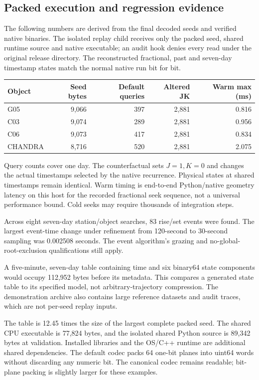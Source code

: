 \subsection{Packed execution and regression evidence}
The following numbers are derived from the final decoded seeds and verified
native binaries. The isolated replay child receives only the packed seed, shared
runtime source and native executable; an audit hook denies every read under the
original release directory. The reconstructed fractional, past and seven-day
timestamp states match the normal native run bit for bit.

\begin{center}\begin{tabular}{@{}lrrrr@{}}\toprule
Object & Seed bytes & Default queries & Altered JK & Warm max (ms)\\\midrule
G05 & 9,066 & 397 & 2,881 & 0.816\\
C03 & 9,074 & 289 & 2,881 & 0.956\\
C06 & 9,073 & 417 & 2,881 & 0.834\\
CHANDRA & 8,716 & 520 & 2,881 & 2.075\\
\bottomrule\end{tabular}\end{center}
Query counts cover one day. The counterfactual sets $J=1,K=0$ and changes the
actual timestamps selected by the native recurrence. Physical states at shared
timestamps remain identical. Warm timing is end-to-end Python/native geometry
latency on this host for the recorded fractional seek sequence, not a universal
performance bound. Cold seeks may require thousands of integration steps.

Across eight seven-day station/object searches, 83 rise/set events were found. The largest event-time change under refinement from 120-second to 30-second sampling was 0.002508 seconds. The event algorithm's grazing and no-global-root-exclusion qualifications still apply.


A five-minute, seven-day table containing time and six binary64 state components
would occupy 112,952 bytes before its metadata. This compares a generated state
table to its specified model, not arbitrary-trajectory compression.
The demonstration archive also contains
large reference datasets and audit traces, which are not per-seed replay inputs.

The table is 12.45 times the size of the largest complete packed seed. The shared CPU executable is 77,824 bytes, and the isolated shared Python source is 89,342 bytes at validation. Installed libraries and the OS/C++ runtime are additional shared dependencies. The default codec packs 64 one-bit planes into uint64 words without discarding any numeric bit. The canonical codec remains readable; bit-plane packing is slightly larger for these examples.

